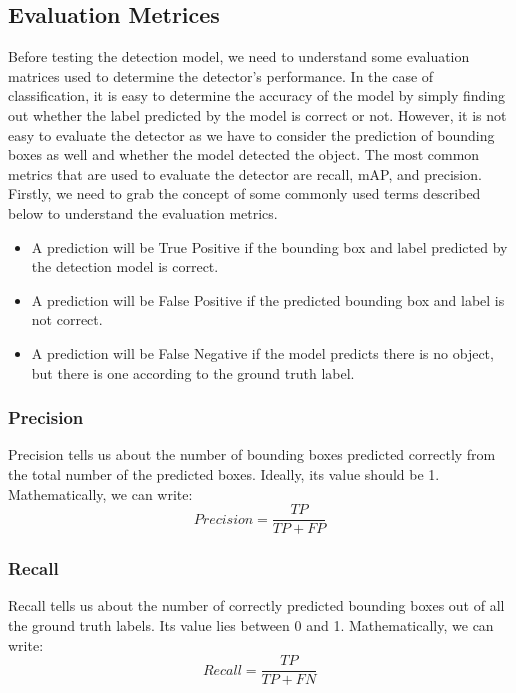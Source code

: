 \subsection{Evaluation Metrices}
Before testing the detection model, we need to understand some evaluation matrices used to determine the detector's performance. In the case of classification, it is easy to determine the accuracy of the model by simply finding out whether the label predicted by the model is correct or not. However, it is not easy to evaluate the detector as we have to consider the prediction of bounding boxes as well and whether the model detected the object. The most common metrics that are used to evaluate the detector are recall, mAP, and precision. Firstly, we need to grab the concept of some commonly used terms described below to understand the evaluation metrics.
\begin{itemize}
    \item  A prediction will be True Positive if the bounding box and label predicted by the detection model is correct.
    \item A prediction will be False Positive if the predicted bounding box and label is not correct.
    \item A prediction will be False Negative if the model predicts there is no object, but there is one according to the ground truth label.
\end{itemize}
\subsubsection*{Precision}
Precision tells us about the number of bounding boxes predicted correctly from the total number of the predicted boxes. Ideally, its value should be 1. Mathematically, we can write:
\begin{equation}
    Precision = \frac{TP}{TP + FP}
\end{equation}
\subsubsection*{Recall}
Recall tells us about the number of correctly predicted bounding boxes out of all the ground truth labels. Its value lies between 0 and 1. Mathematically, we can write:
\begin{equation}
    Recall = \frac{TP}{TP + FN}
\end{equation}
